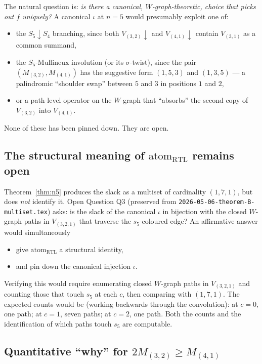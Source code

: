 \documentclass[11pt]{article}
\theoremstyle{definition}
\begin{document}
The natural question is: \emph{is there a canonical, $W$-graph-theoretic, choice that picks out $f$ uniquely?} A canonical $\iota$ at $n=5$ would presumably exploit one of:
\begin{itemize}[leftmargin=2em,topsep=0.3em,itemsep=0.2em]
\item the $S_5 \downarrow S_4$ branching, since both $V_{(3,2)} \downarrow$ and $V_{(4,1)} \downarrow$ contain $V_{(3,1)}$ as a common summand,
\item the $S_5$-Mullineux involution (or its $\sigma$-twist), since the pair $(M_{(3,2)}, M_{(4,1)})$ has the suggestive form $(1, 5, 3)$ and $(1, 3, 5)$ --- a palindromic ``shoulder swap'' between $5$ and $3$ in positions $1$ and $2$,
\item or a path-level operator on the $W$-graph that ``absorbs'' the second copy of $V_{(3,2)}$ into $V_{(4,1)}$.
\end{itemize}
None of these has been pinned down. They are open.

\subsection*{The structural meaning of $\mathrm{atom}_{\mathrm{RTL}}$ remains open}

Theorem~\ref{thm:n5} produces the slack as a multiset of cardinality $(1,7,1)$, but does \emph{not} identify it. Open Question Q3 (preserved from \texttt{2026-05-06-theorem-B-multiset.tex}) asks: is the slack of the canonical $\iota$ in bijection with the closed $W$-graph paths in $V_{(3,2,1)}$ that traverse the $s_5$-coloured edge? An affirmative answer would simultaneously
\begin{itemize}[leftmargin=2em,topsep=0.3em,itemsep=0.2em]
\item give $\mathrm{atom}_{\mathrm{RTL}}$ a structural identity,
\item and pin down the canonical injection $\iota$.
\end{itemize}
Verifying this would require enumerating closed $W$-graph paths in $V_{(3,2,1)}$ and counting those that touch $s_5$ at each $c$, then comparing with $(1, 7, 1)$. The expected counts would be (working backwards through the convolution): at $c = 0$, one path; at $c = 1$, seven paths; at $c = 2$, one path. Both the counts and the identification of which paths touch $s_5$ are computable.

\subsection*{Quantitative ``why'' for $2 M_{(3,2)} \geq M_{(4,1)}$}
\end{document}
